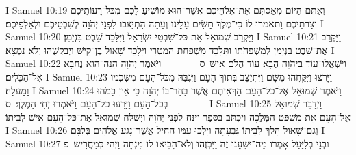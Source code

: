 I Samuel 10:19	וְאַתֶּם הַיּוֹם מְאַסְתֶּם אֶת־אֱלֹהֵיכֶם אֲשֶׁר־הוּא מוֹשִׁיעַ לָכֶם מִכּל־רָעוֹתֵיכֶם וְצָרֹתֵיכֶם וַתֹּאמְרוּ לוֹ כִּי־מֶלֶךְ תָּשִׂים עָלֵינוּ וְעַתָּה הִתְיַצְּבוּ לִפְנֵי יְהֹוָה לְשִׁבְטֵיכֶם וּלְאַלְפֵיכֶם׃
I Samuel 10:20	וַיַּקְרֵב שְׁמוּאֵל אֵת כּל־שִׁבְטֵי יִשְׂרָאֵל וַיִּלָּכֵד שֵׁבֶט בִּנְיָמִן׃
I Samuel 10:21	וַיַּקְרֵב אֶת־שֵׁבֶט בִּנְיָמִן לְמִשְׁפְּחֹתָו וַתִּלָּכֵד מִשְׁפַּחַת הַמַּטְרִי וַיִּלָּכֵד שָׁאוּל בֶּן־קִישׁ וַיְבַקְשֻׁהוּ וְלֹא נִמְצָא׃
I Samuel 10:22	וַיִּשְׁאֲלוּ־עוֹד בַּיהֹוָה הֲבָא עוֹד הֲלֹם אִישׁ {ס}        וַיֹּאמֶר יְהֹוָה הִנֵּה־הוּא נֶחְבָּא אֶל־הַכֵּלִים׃
I Samuel 10:23	וַיָּרֻצוּ וַיִּקָּחֻהוּ מִשָּׁם וַיִּתְיַצֵּב בְּתוֹךְ הָעָם וַיִּגְבַּהּ מִכּל־הָעָם מִשִּׁכְמוֹ וָמָעְלָה׃
I Samuel 10:24	וַיֹּאמֶר שְׁמוּאֵל אֶל־כּל־הָעָם הַרְּאִיתֶם אֲשֶׁר בָּחַר־בּוֹ יְהֹוָה כִּי אֵין כָּמֹהוּ בְּכל־הָעָם וַיָּרִעוּ כל־הָעָם וַיֹּאמְרוּ יְחִי הַמֶּלֶךְ׃ {ס}        
I Samuel 10:25	וַיְדַבֵּר שְׁמוּאֵל אֶל־הָעָם אֵת מִשְׁפַּט הַמְּלֻכָה וַיִּכְתֹּב בַּסֵּפֶר וַיַּנַּח לִפְנֵי יְהֹוָה וַיְשַׁלַּח שְׁמוּאֵל אֶת־כּל־הָעָם אִישׁ לְבֵיתוֹ׃
I Samuel 10:26	וְגַם־שָׁאוּל הָלַךְ לְבֵיתוֹ גִּבְעָתָה וַיֵּלְכוּ עִמּוֹ הַחַיִל אֲשֶׁר־נָגַע אֱלֹהִים בְּלִבָּם׃
I Samuel 10:27	וּבְנֵי בְלִיַּעַל אָמְרוּ מַה־יֹּשִׁעֵנוּ זֶה וַיִּבְזֻהוּ וְלֹא־הֵבִיאוּ לוֹ מִנְחָה וַיְהִי כְּמַחֲרִישׁ׃ {פ}
